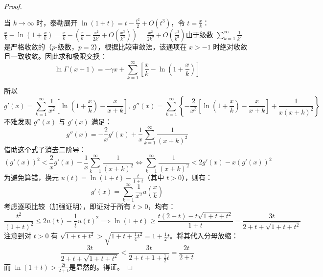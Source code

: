 \begin{proof}
\begin{note}
当 $k \to \infty$ 时，泰勒展开 $\ln(1+t) = t - \frac{t^2}{2} + O(t^3)$，令 $t = \frac{x}{k}$：
$\frac{x}{k} - \ln\left(1 + \frac{x}{k}\right) = \frac{x}{k} - \left( \frac{x}{k} - \frac{x^2}{2k^2} + O\left(\frac{x^3}{k^3}\right) \right) = \frac{x^2}{2k^2} + O\left(\frac{x^3}{k^3}\right)$由于级数 $\sum_{k=1}^\infty \frac{1}{k^2}$ 是严格收敛的（$p$-级数，$p=2$），根据比较审敛法，该通项在 $x > -1$ 时绝对收敛且一致收敛。因此求和极限交换：\[\ln \Gamma(x+1) = -\gamma x + \sum_{k=1}^\infty \left[ \frac{x}{k} - \ln\left(1 + \frac{x}{k}\right) \right]\]
\end{note}
所以$$g'(x) = \sum_{k=1}^\infty \frac{1}{x^2} \left[ \ln\left(1 + \frac{x}{k}\right) - \frac{x}{x+k} \right],~g''(x) = \sum_{k=1}^\infty \left\{ -\frac{2}{x^3}\left[ \ln\left(1 + \frac{x}{k}\right) - \frac{x}{x+k} \right] + \frac{1}{x(x+k)^2} \right\}$$
不难发现 $g''(x)$ 与 $g'(x)$ 满足：$$g''(x) = -\frac{2}{x}g'(x) + \frac{1}{x}\sum_{k=1}^\infty \frac{1}{(x+k)^2}$$
借助这个式子消去二阶导：$$(g'(x))^2 < \frac{2}{x}g'(x) - \frac{1}{x}\sum_{k=1}^\infty \frac{1}{(x+k)^2} \iff \sum_{k=1}^\infty \frac{1}{(x+k)^2} < 2g'(x) - x(g'(x))^2$$
为避免算错，换元 $u(t) = \ln(1+t) - \frac{t}{1+t}$（其中 $t > 0$），则有：
$$g'(x) = \sum_{k=1}^\infty \frac{1}{x^2} u\left(\frac{x}{k}\right)$$考虑逐项比较（加强证明），即证对于所有 $t > 0$，均有：$$\frac{t^2}{(1+t)^2} \le 2u(t) - \frac{1}{t}u(t)^2\implies \ln(1+t) \ge \frac{t(2+t) - t\sqrt{1+t+t^2}}{1+t}= \frac{3t}{2+t+\sqrt{1+t+t^2}}$$注意到对 $t > 0$ 有 $\displaystyle\sqrt{1+t+t^2} > \sqrt{1+t+\frac{1}{4}t^2} = 1+\frac{1}{2}t$。将其代入分母放缩：$$\frac{3t}{2+t+\sqrt{1+t+t^2}} < \frac{3t}{2+t+1+\frac{1}{2}t} = \frac{2t}{2+t}$$而 $\ln(1+t) > \frac{2t}{2+t}$是显然的。得证。
\end{proof}



